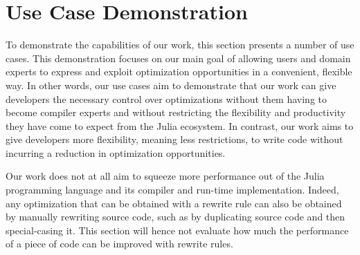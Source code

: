 
\section{Use Case Demonstration}
\label{sec:usecase}
To demonstrate the capabilities of our work, this section presents a number of use cases. This demonstration focuses on our main goal of allowing users and domain experts to express and exploit optimization opportunities in a convenient, flexible way. In other words, our use cases aim to demonstrate that our work can give developers the necessary control over optimizations without them having to become compiler experts and without restricting the flexibility and productivity they have come to expect from the Julia ecosystem. In contrast, our work aims to give developers more flexibility, meaning less restrictions, to write code without incurring a reduction in optimization opportunities.  

Our work does not at all aim to squeeze more performance out of the Julia programming language and its compiler and run-time implementation. Indeed, any optimization that can be obtained with a rewrite rule can also be obtained by manually rewriting source code, such as by duplicating source code and then special-casing it. This section will hence not evaluate how much the performance of a piece of code can be improved with rewrite rules.


